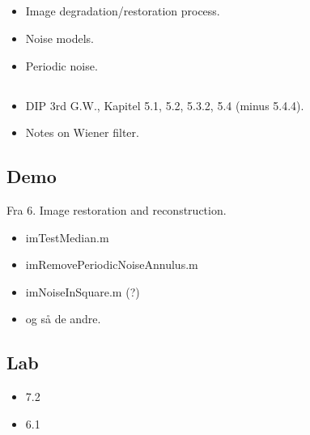 \subsection{\subtopics}

\begin{itemize}
	\item Image degradation/restoration process.
	\item Noise models.
	\item Periodic noise.
\end{itemize}

\subsection{\curriculum}

\begin{itemize}
	\item DIP 3rd G.W., Kapitel 5.1, 5.2, 5.3.2, 5.4 (minus 5.4.4).
	\item Notes on Wiener filter.
\end{itemize}

\subsection{Demo}

Fra 6. Image restoration and reconstruction.

\begin{itemize}
	\item imTestMedian.m
	\item imRemovePeriodicNoiseAnnulus.m
	\item imNoiseInSquare.m (?)
	\item og så de andre.
\end{itemize}

\subsection{Lab}

\begin{itemize}
	\item 7.2
	\item 6.1
\end{itemize}
